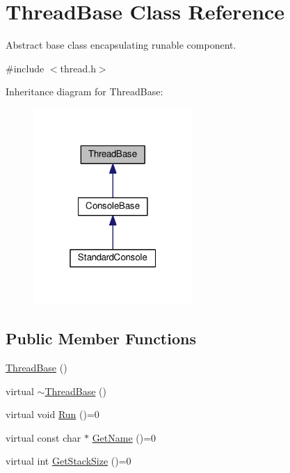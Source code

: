 \hypertarget{classThreadBase}{}\section{Thread\+Base Class Reference}
\label{classThreadBase}


Abstract base class encapsulating runable component.  




{\ttfamily \#include $<$thread.\+h$>$}



Inheritance diagram for Thread\+Base\+:
\nopagebreak
\begin{figure}[H]
\begin{center}
\leavevmode
\includegraphics[width=172pt]{db/d6e/classThreadBase__inherit__graph}
\end{center}
\end{figure}
\subsection*{Public Member Functions}
\begin{DoxyCompactItemize}
\item 
\hyperlink{classThreadBase_af66330f2f5605a8f104ec346014da976}{Thread\+Base} ()
\item 
virtual \hyperlink{classThreadBase_a3dbbd3714a3a446c74258c34bf9f6da0}{$\sim$\+Thread\+Base} ()
\item 
virtual void \hyperlink{classThreadBase_a795d258c1f40c123859d0e83dce6a0ad}{Run} ()=0
\item 
virtual const char $\ast$ \hyperlink{classThreadBase_a1d02a7e6cd287e1d72b9cac00e8061d4}{Get\+Name} ()=0
\item 
virtual int \hyperlink{classThreadBase_a676ce2be4c9801fdfdc30f484547caef}{Get\+Stack\+Size} ()=0
\end{DoxyCompactItemize}


